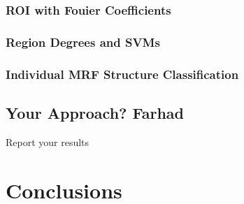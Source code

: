 \documentclass{article} %
\begin{document}
\subsubsection{ROI with Fouier Coefficients}

\subsubsection{Region Degrees and SVMs}

\subsubsection{Individual MRF Structure Classification}

\subsection{Your Approach? Farhad}
Report your results

\section{Conclusions}





	
\end{document}
